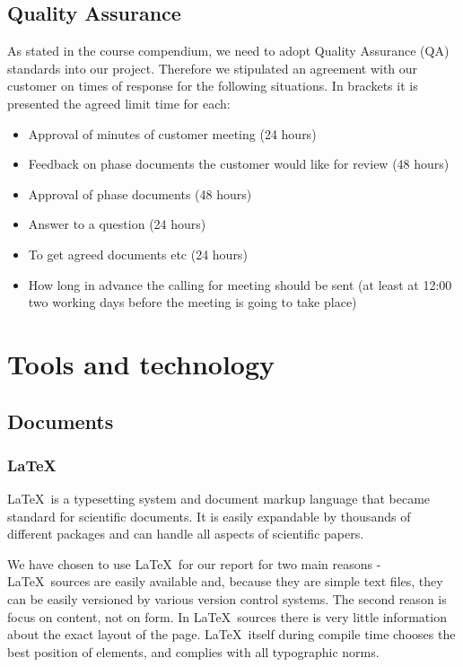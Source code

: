 \documentclass[11pt,a4paper,titlepage,oneside]{report}
\begin{document}
\section{Quality Assurance}
As stated in the course compendium, we need to adopt Quality Assurance (QA) standards into our project. Therefore we stipulated an agreement with our customer on times of response for the following situations. In brackets it is presented the agreed limit time for each:
\begin{itemize}
\item Approval of minutes of customer meeting (24 hours)
\item Feedback on phase documents the customer would like for review (48 hours)
\item Approval of phase documents (48 hours)
\item Answer to a question (24 hours)
\item To get agreed documents etc (24 hours)
\item How long in advance the calling for meeting should be sent (at least at 12:00 two working days before the meeting is going to take place)
\end{itemize}

\chapter{Tools and technology}
\label{chap:ToolsAndTech}
\section{Documents}

  \subsection{\LaTeX}
  \LaTeX~is a typesetting system and document markup language that became standard for scientific documents. It is easily expandable by thousands of different packages and can handle all aspects of scientific papers.

  We have chosen to use \LaTeX~for our report for two main reasons - \LaTeX~sources are easily available and, because they are simple text files, they can be easily versioned by various version control systems. The second reason is focus on content, not on form. In \LaTeX~sources there is very little information about the exact layout of the page. \LaTeX~itself during compile time chooses the best position of elements, and complies with all typographic norms.
\end{document}
